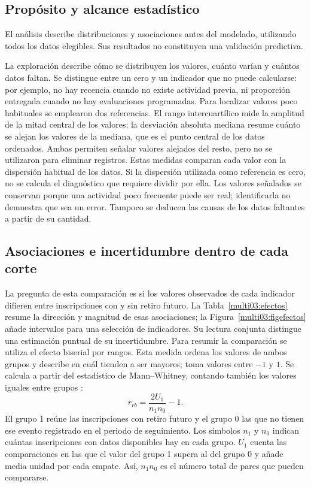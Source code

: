 \subsection{Propósito y alcance estadístico}
El análisis describe distribuciones y asociaciones antes del modelado, utilizando todos los datos elegibles. Sus resultados no constituyen una validación predictiva.

La exploración describe cómo se distribuyen los valores, cuánto varían y cuántos datos faltan. Se distingue entre un cero y un indicador que no puede calcularse: por ejemplo, no hay recencia cuando no existe actividad previa, ni proporción entregada cuando no hay evaluaciones programadas. Para localizar valores poco habituales se emplearon dos referencias. El rango intercuartílico mide la amplitud de la mitad central de los valores; la desviación absoluta mediana resume cuánto se alejan los valores de la mediana, que es el punto central de los datos ordenados. Ambas permiten señalar valores alejados del resto, pero no se utilizaron para eliminar registros. Estas medidas comparan cada valor con la dispersión habitual de los datos. Si la dispersión utilizada como referencia es cero, no se calcula el diagnóstico que requiere dividir por ella. Los valores señalados se conservan porque una actividad poco frecuente puede ser real; identificarla no demuestra que sea un error. Tampoco se deducen las causas de los datos faltantes a partir de su cantidad.

\subsection{Asociaciones e incertidumbre dentro de cada corte}
La pregunta de esta comparación es si los valores observados de cada indicador difieren entre inscripciones con y sin retiro futuro. La Tabla~\ref{multi03:efectos} resume la dirección y magnitud de esas asociaciones; la Figura~\ref{multi03:figefectos} añade intervalos para una selección de indicadores. Su lectura conjunta distingue una estimación puntual de su incertidumbre.
Para resumir la comparación se utiliza el efecto biserial por rangos. Esta medida ordena los valores de ambos grupos y describe en cuál tienden a ser mayores; toma valores entre $-1$ y $1$. Se calcula a partir del estadístico de Mann--Whitney, contando también los valores iguales entre grupos \cite{revscipy}:
\[
r_{rb}=\frac{2U_1}{n_1n_0}-1.
\]
El grupo 1 reúne las inscripciones con retiro futuro y el grupo 0 las que no tienen ese evento registrado en el periodo de seguimiento. Los símbolos $n_1$ y $n_0$ indican cuántas inscripciones con datos disponibles hay en cada grupo. $U_1$ cuenta las comparaciones en las que el valor del grupo 1 supera al del grupo 0 y añade media unidad por cada empate. Así, $n_1n_0$ es el número total de pares que pueden compararse.

